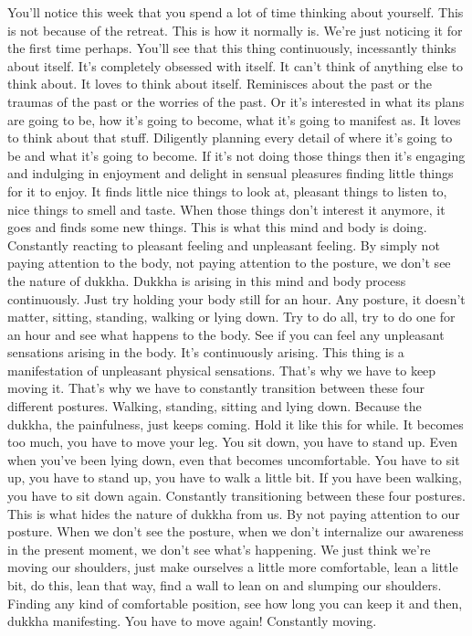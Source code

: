 \documentclass[letterpaper,10pt,english]{sphinxmanual}
\begin{document}
\sphinxAtStartPar
You’ll  notice  this  week  that  you  spend  a  lot  of  time  thinking  about
yourself. This is not because of the retreat. This is how it normally is. We’re
just noticing it for the first time perhaps. You’ll see that this thing continuously,  incessantly  thinks  about  itself.  It’s  completely  obsessed  with  itself.
It can’t think of anything else to think about. It loves to think about itself.
Reminisces about the past or the traumas of the past or the worries of the
past. Or it’s interested in what its plans are going to be, how it’s going to
become,  what  it’s  going  to  manifest  as.  It  loves  to  think  about  that  stuff.
Diligently planning every detail of where it’s going to be and what it’s going
to  become.  If  it’s  not  doing  those  things  then  it’s  engaging  and  indulging
in enjoyment and delight in sensual pleasures finding little things for it to
enjoy. It finds little nice things to look at, pleasant things to listen to, nice
things  to  smell  and  taste.  When  those  things  don’t  interest  it  anymore,  it
goes and finds some new things. This is what this mind and body is doing.
Constantly  reacting  to  pleasant  feeling  and  unpleasant  feeling.
By simply not paying attention to the
body, not paying attention to the posture, we don’t see the nature of dukkha.
Dukkha is arising in this mind and body process continuously. Just try holding your body still for an hour. Any posture, it doesn’t matter, sitting, standing, walking or lying down. Try to do all, try to do one for an hour and see
what  happens  to  the  body.  See  if  you  can  feel  any  unpleasant  sensations
  arising in the body. It’s continuously arising. This thing is a manifestation
of unpleasant physical sensations. That’s why we have to keep moving it.
That’s  why  we  have  to  constantly  transition  between  these  four  different
postures.  Walking,  standing,  sitting  and  lying  down.  Because  the  dukkha,
the painfulness, just keeps coming. Hold it like this for while. It becomes
too much, you have to move your leg. You sit down, you have to stand up.
Even when you’ve been lying down, even that becomes uncomfortable. You
have to sit up, you have to stand up, you have to walk a little bit. If you have
been walking, you have to sit down again. Constantly transitioning between
these four postures. This is what hides the nature of dukkha from us. By not
paying  attention  to  our  posture. When  we  don’t  see  the  posture,  when  we
don’t internalize our awareness in the present moment, we don’t see what’s
happening. We just think we’re moving our shoulders, just make ourselves a
little more comfortable, lean a little bit, do this, lean that way, find a wall to
lean on and slumping our shoulders. Finding any kind of comfortable position, see how long you can keep it and then, dukkha manifesting. You have
to move again! Constantly moving.
\end{document}

